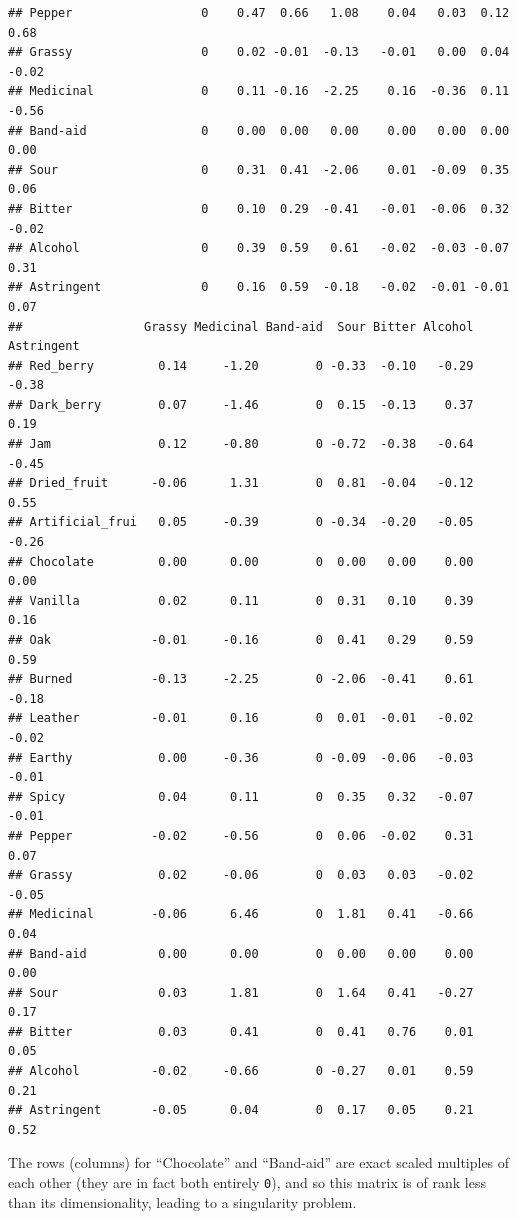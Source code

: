 \documentclass[
]{book}
\begin{document}
\begin{verbatim}
## Pepper                  0    0.47  0.66   1.08    0.04   0.03  0.12   0.68
## Grassy                  0    0.02 -0.01  -0.13   -0.01   0.00  0.04  -0.02
## Medicinal               0    0.11 -0.16  -2.25    0.16  -0.36  0.11  -0.56
## Band-aid                0    0.00  0.00   0.00    0.00   0.00  0.00   0.00
## Sour                    0    0.31  0.41  -2.06    0.01  -0.09  0.35   0.06
## Bitter                  0    0.10  0.29  -0.41   -0.01  -0.06  0.32  -0.02
## Alcohol                 0    0.39  0.59   0.61   -0.02  -0.03 -0.07   0.31
## Astringent              0    0.16  0.59  -0.18   -0.02  -0.01 -0.01   0.07
##                 Grassy Medicinal Band-aid  Sour Bitter Alcohol Astringent
## Red_berry         0.14     -1.20        0 -0.33  -0.10   -0.29      -0.38
## Dark_berry        0.07     -1.46        0  0.15  -0.13    0.37       0.19
## Jam               0.12     -0.80        0 -0.72  -0.38   -0.64      -0.45
## Dried_fruit      -0.06      1.31        0  0.81  -0.04   -0.12       0.55
## Artificial_frui   0.05     -0.39        0 -0.34  -0.20   -0.05      -0.26
## Chocolate         0.00      0.00        0  0.00   0.00    0.00       0.00
## Vanilla           0.02      0.11        0  0.31   0.10    0.39       0.16
## Oak              -0.01     -0.16        0  0.41   0.29    0.59       0.59
## Burned           -0.13     -2.25        0 -2.06  -0.41    0.61      -0.18
## Leather          -0.01      0.16        0  0.01  -0.01   -0.02      -0.02
## Earthy            0.00     -0.36        0 -0.09  -0.06   -0.03      -0.01
## Spicy             0.04      0.11        0  0.35   0.32   -0.07      -0.01
## Pepper           -0.02     -0.56        0  0.06  -0.02    0.31       0.07
## Grassy            0.02     -0.06        0  0.03   0.03   -0.02      -0.05
## Medicinal        -0.06      6.46        0  1.81   0.41   -0.66       0.04
## Band-aid          0.00      0.00        0  0.00   0.00    0.00       0.00
## Sour              0.03      1.81        0  1.64   0.41   -0.27       0.17
## Bitter            0.03      0.41        0  0.41   0.76    0.01       0.05
## Alcohol          -0.02     -0.66        0 -0.27   0.01    0.59       0.21
## Astringent       -0.05      0.04        0  0.17   0.05    0.21       0.52
\end{verbatim}

The rows (columns) for ``Chocolate'' and ``Band-aid'' are exact scaled multiples of each other (they are in fact both entirely \texttt{0}), and so this matrix is of rank less than its dimensionality, leading to a singularity problem.
\end{document}
